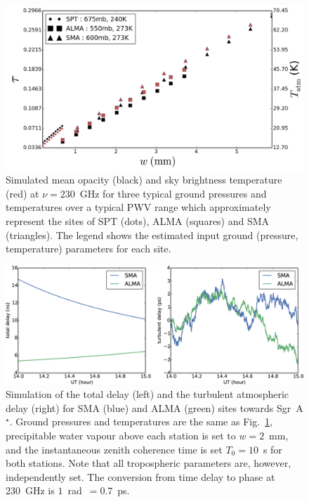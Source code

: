 \begin{figure}
\begin{center}
\includegraphics[width=1.\columnwidth]{Images/opacity}
\caption{Simulated mean opacity (black) and sky brightness temperature (red) at $\nu =230$~GHz  for three typical ground pressures and temperatures over a typical PWV range \citep{Lane_1998} which approximately represent the sites of SPT (dots), ALMA (squares) and SMA (triangles). The legend shows the estimated input ground (pressure, temperature) parameters for each site.\label{fig:mean_atm}%
}
\end{center}
\end{figure}


\begin{figure}
\begin{center}
\includegraphics[width=\columnwidth]{Images/delays}
\caption{Simulation of the total delay (left) and the turbulent atmospheric delay (right) for SMA (blue) and ALMA (green) sites towards Sgr~A$^\star$. Ground pressures and temperatures are the same as Fig.~\ref{fig:mean_atm}, precipitable water vapour above each station is set to $w=2$~mm, and the instantaneous zenith coherence time is set $T_0=10$~s for both stations. Note that all tropospheric parameters are, however, independently set. The conversion from time delay to phase at 230~GHz is $1$~rad~$=0.7$~ps.\label{delay_plots}%
}
\end{center}
\end{figure}


